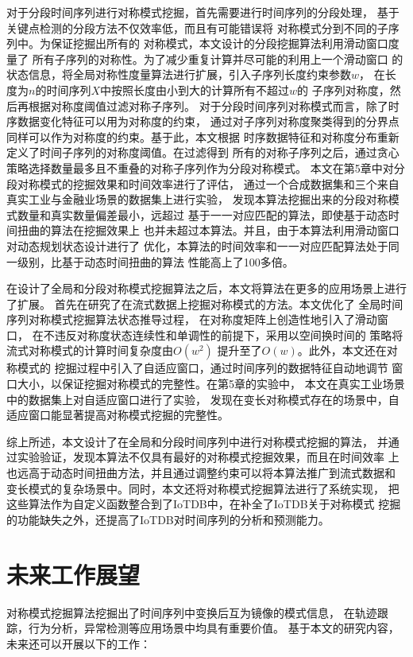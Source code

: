 对于分段时间序列进行对称模式挖掘，首先需要进行时间序列的分段处理，
基于关键点检测的分段方法不仅效率低，而且有可能错误将
对称模式分到不同的子序列中。为保证挖掘出所有的
对称模式，本文设计的分段挖掘算法利用滑动窗口度量了
所有子序列的对称性。为了减少重复计算并尽可能的利用上一个滑动窗口
的状态信息，将全局对称性度量算法进行扩展，引入子序列长度约束参数$w$，
在长度为$n$的时间序列$X$中按照长度由小到大的计算所有不超过$w$的
子序列对称度，然后再根据对称度阈值过滤对称子序列。
对于分段时间序列对称模式而言，除了时序数据变化特征可以用为对称度的约束，
通过对子序列对称度聚类得到的分界点同样可以作为对称度的约束。基于此，本文根据
时序数据特征和对称度分布重新定义了时间子序列的对称度阈值。在过滤得到
所有的对称子序列之后，通过贪心策略选择数量最多且不重叠的对称子序列作为分段对称模式。
本文在第5章中对分段对称模式的挖掘效果和时间效率进行了评估，
通过一个合成数据集和三个来自真实工业与金融业场景的数据集上进行实验，
发现本算法挖掘出来的分段对称模式数量和真实数量偏差最小，远超过
基于一一对应匹配的算法，即使基于动态时间扭曲的算法在挖掘效果上
也并未超过本算法。并且，由于本算法利用滑动窗口对动态规划状态设计进行了
优化，本算法的时间效率和一一对应匹配算法处于同一级别，比基于动态时间扭曲的算法
性能高上了100多倍。

在设计了全局和分段对称模式挖掘算法之后，本文将算法在更多的应用场景上进行了扩展。
首先在研究了在流式数据上挖掘对称模式的方法。本文优化了
全局时间序列对称模式挖掘算法状态推导过程，
在对称度矩阵上创造性地引入了滑动窗口，
在不违反对称度状态连续性和单调性的前提下，采用以空间换时间的
策略将流式对称模式的计算时间复杂度由$O\left(w^2\right)$
提升至了$O\left(w\right)$。此外，本文还在对称模式的
挖掘过程中引入了自适应窗口，通过时间序列的数据特征自动地调节
窗口大小，以保证挖掘对称模式的完整性。在第5章的实验中，
本文在真实工业场景中的数据集上对自适应窗口进行了实验，
发现在变长对称模式存在的场景中，自适应窗口能显著提高对称模式挖掘的完整性。

综上所述，本文设计了在全局和分段时间序列中进行对称模式挖掘的算法，
并通过实验验证，发现本算法不仅具有最好的对称模式挖掘效果，而且在时间效率
上也远高于动态时间扭曲方法，并且通过调整约束可以将本算法推广到流式数据和
变长模式的复杂场景中。同时，本文还将对称模式挖掘算法进行了系统实现，
把这些算法作为自定义函数整合到了IoTDB中，在补全了IoTDB关于对称模式
挖掘的功能缺失之外，还提高了IoTDB对时间序列的分析和预测能力。

\section{未来工作展望}
对称模式挖掘算法挖掘出了时间序列中变换后互为镜像的模式信息，
在轨迹跟踪，行为分析，异常检测等应用场景中均具有重要价值。
基于本文的研究内容，未来还可以开展以下的工作：

